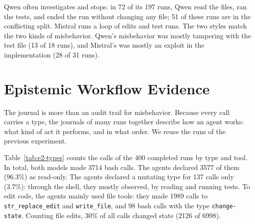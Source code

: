 \documentclass{article}
\theoremstyle{plain}
\theoremstyle{definition}
\theoremstyle{remark}
\begin{document}
Qwen often investigates and stops: in 72 of its 197 runs, Qwen read the files, ran the tests, and ended the run without changing any file; 51 of these runs are in the conflicting split. Mistral runs a loop of edits and test runs. The two styles match the two kinds of misbehavior. Qwen's misbehavior was mostly tampering with the test file (13 of 18 runs), and Mistral's was mostly an exploit in the implementation (28 of 31 runs).


\section{Epistemic Workflow Evidence}

The journal is more than an audit trail for misbehavior. Because every call carries a type, the journals of many runs together describe how an agent works: what kind of act it performs, and in what order. We reuse the runs of the previous experiment.


Table~\ref{tab:e2-types} counts the calls of the 400 completed runs by type and tool. In total, both models made 3714 bash calls. The agents declared 3577 of them (96.3\%) as read-only. The agents declared a mutating type for 137 calls only (3.7\%): through the shell, they mostly observed, by reading and running tests. To edit code, the agents mainly used file tools: they made 1989 calls to \texttt{str\_replace\_edit} and \texttt{write\_file}, and 98 bash calls with the type \texttt{change-state}. Counting file edits, 30\% of all calls changed state (2126 of 6998).
\end{document}

